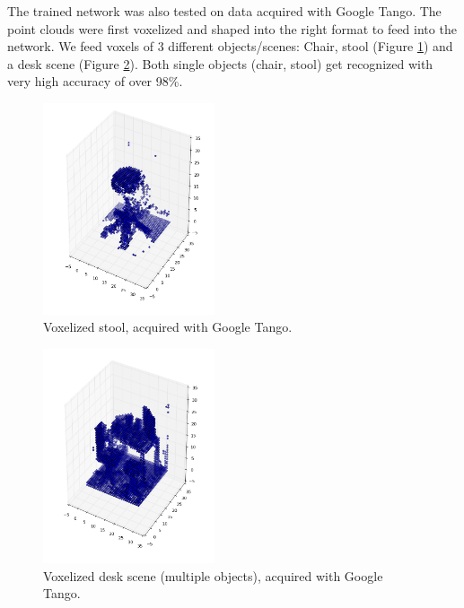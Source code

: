 \documentclass[10pt,twocolumn,letterpaper]{article}
\begin{document}
\vspace{0.3cm}
The trained network was also tested on data acquired with Google Tango. The point clouds were first voxelized
and shaped into the right format to feed into the network. We feed voxels of 3 different objects/scenes: Chair, 
stool (Figure \ref{fig:voxel_stool}) and a desk scene (Figure \ref{fig:voxel_desk}). Both single objects (chair, 
stool) get recognized with very high accuracy of over 98\%.

\begin{figure}[h]
	\label{fig:voxel_stool}
	\centering
	\includegraphics[width=0.45\textwidth]{figures/tango_voxel_stool}
	\caption{Voxelized stool, acquired with Google Tango.}
\end{figure}

\begin{figure}[h]
	\label{fig:voxel_desk}
	\centering
	\includegraphics[width=0.45\textwidth]{figures/tango_voxel_desk_scene}
	\caption{Voxelized desk scene (multiple objects), acquired with Google Tango.}
\end{figure}
\end{document}
